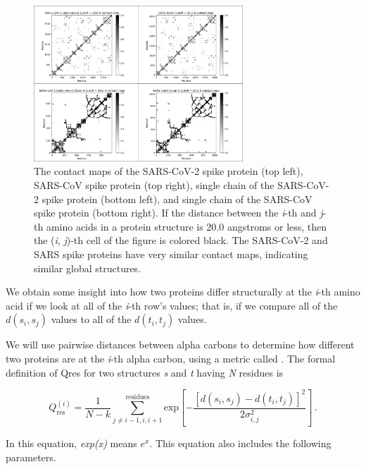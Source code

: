 \begin{figure}[h]
	\centering
	\mySfFamily
	\includegraphics[width = 0.7\textwidth]{../images/Contact.png}
	\caption{The contact maps of the SARS-CoV-2 spike protein (top left), SARS-CoV spike protein (top right), single chain of the SARS-CoV-2 spike protein (bottom left), and single chain of the SARS-CoV spike protein (bottom right). If the distance between the \textit{i}-th and \textit{j}-th amino acids in a protein structure is 20.0 angstroms or less, then the (\textit{i}, \textit{j})-th cell of the figure is colored black. The SARS-CoV-2 and SARS spike proteins have very similar contact maps, indicating similar global structures.}
	\label{fig:Contact}
\end{figure}

\begin{qbox}\end{qbox}

We obtain some insight into how two proteins differ structurally at the \textit{i}-th amino acid if we look at all of the \textit{i}-th row's values; that is, if we compare all of the $d(s_{i}, s_{j})$ values to all of the $d(t_{i}, t_{j})$ values.

We will use pairwise distances between alpha carbons to determine how different two proteins are at the \textit{i}-th alpha carbon, using a metric called .  The formal definition of Qres for two structures \textit{s} and \textit{t} having \textit{N} residues is

$$Q_{\text{res}}^{(i)} = \dfrac{1}{N-k} \sum^{\text{residues}}_{j\neq i-1,i,i+1} \textrm{exp}[-\dfrac{[d(s_i,s_j)-d(t_i,t_j)]^2}{2\sigma^2_{i,j}}]\, .$$

In this equation, \textit{exp(x)} means $e^{x}$. This equation also includes the following parameters.

